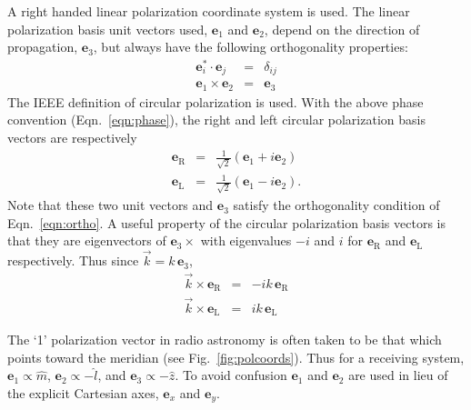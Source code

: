 \documentclass{article}
\begin{document}
A right handed linear polarization coordinate system is used.  The linear
polarization basis unit vectors used, $\mathbf{e}_1$ and $\mathbf{e}_2$, depend
on the direction of propagation, $\mathbf{e}_3$, but always have the following 
orthogonality properties:
\begin{eqnarray}
\mathbf{e}_i^* \cdot \mathbf{e}_j & = & \delta_{ij} \label{eqn:ortho} \\
\mathbf{e}_1 \times \mathbf{e}_2 & = & \mathbf{e}_3
\end{eqnarray}
The IEEE definition of circular polarization is used.  With the above 
phase convention (Eqn.~\ref{eqn:phase}), 
the right and left circular polarization basis vectors are respectively
\begin{eqnarray}
	\mathbf{e}_\mathrm{R} & = & 
		\frac{1}{\sqrt{2}}(\mathbf{e}_1 + i \mathbf{e}_2) \\
	\mathbf{e}_\mathrm{L} & = & 
		\frac{1}{\sqrt{2}}(\mathbf{e}_1 - i \mathbf{e}_2) .
\end{eqnarray}
Note that these two unit vectors and $\mathbf{e}_3$ satisfy the orthogonality
condition of Eqn.~\ref{eqn:ortho}.  A useful property of the circular
polarization basis vectors is that they are eigenvectors of 
$\mathbf{e}_3 \times$ with eigenvalues $-i$ and $i$ for 
$\mathbf{e}_\mathrm{R}$ and $\mathbf{e}_\mathrm{L}$
respectively.  Thus since $\vec{k} = k\, \mathbf{e}_3$,
\begin{eqnarray}
\vec{k} \times \mathbf{e}_\mathrm{R} & = & -ik\, \mathbf{e}_\mathrm{R} 
\label{eqn:ker} \\
\vec{k} \times \mathbf{e}_\mathrm{L} & = &  ik\, \mathbf{e}_\mathrm{L} 
\label{eqn:kel}
\end{eqnarray}

The `1' polarization vector in radio astronomy is often taken to
be that which points toward the meridian (see Fig.~\ref{fig:polcoords}).
Thus for a receiving system, 
$\mathbf{e}_1 \propto \hat{m}$, $\mathbf{e}_2 \propto -\hat{l}$, and
$\mathbf{e}_3 \propto -\hat{z}$.
To avoid confusion $\mathbf{e}_1$ and $\mathbf{e}_2$ are used in lieu
of the explicit Cartesian axes, $\mathbf{e}_x$ and $\mathbf{e}_y$.
\end{document}
